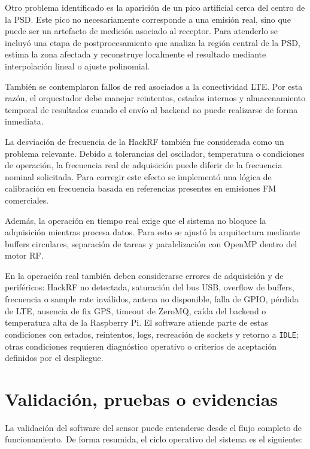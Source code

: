 Otro problema identificado es la aparición de un pico artificial cerca del centro
de la PSD. Este pico no necesariamente corresponde a una emisión real, sino que
puede ser un artefacto de medición asociado al receptor. Para atenderlo se incluyó
una etapa de postprocesamiento que analiza la región central de la PSD, estima la
zona afectada y reconstruye localmente el resultado mediante interpolación lineal
o ajuste polinomial.

También se contemplaron fallos de red asociados a la conectividad LTE. Por esta
razón, el orquestador debe manejar reintentos, estados internos y almacenamiento
temporal de resultados cuando el envío al backend no puede realizarse de forma
inmediata.

La desviación de frecuencia de la HackRF también fue considerada como un problema
relevante. Debido a tolerancias del oscilador, temperatura o condiciones de
operación, la frecuencia real de adquisición puede diferir de la frecuencia nominal
solicitada. Para corregir este efecto se implementó una lógica de calibración en
frecuencia basada en referencias presentes en emisiones FM comerciales.

Además, la operación en tiempo real exige que el sistema no bloquee la adquisición
mientras procesa datos. Para esto se ajustó la arquitectura mediante buffers
circulares, separación de tareas y paralelización con OpenMP dentro del motor RF.

En la operación real también deben considerarse errores de adquisición y de
periféricos: HackRF no detectada, saturación del bus USB, overflow de buffers,
frecuencia o sample rate inválidos, antena no disponible, falla de GPIO, pérdida
de LTE, ausencia de fix GPS, timeout de ZeroMQ, caída del backend o temperatura
alta de la Raspberry Pi. El software atiende parte de estas condiciones con
estados, reintentos, logs, recreación de sockets y retorno a \texttt{IDLE}; otras
condiciones requieren diagnóstico operativo o criterios de aceptación definidos
por el despliegue.


\section{Validación, pruebas o evidencias}

La validación del software del sensor puede entenderse desde el flujo completo de
funcionamiento. De forma resumida, el ciclo operativo del sistema es el siguiente:

